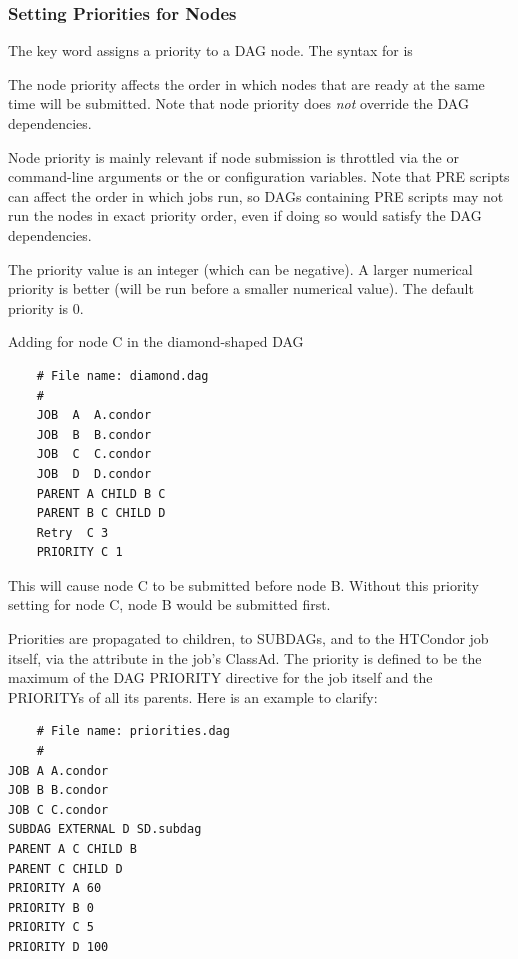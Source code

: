 \subsubsection{Setting Priorities for Nodes}

The  key word assigns a priority to a DAG node.
The syntax for  is

  

The node priority affects the order in which nodes that are ready
at the same time will be submitted.  Note that node priority does
\emph{not} override the DAG dependencies.

Node priority is mainly relevant if
node submission is throttled via the  or 
command-line arguments or the  or
 configuration variables.  Note that PRE
scripts can affect the order in which jobs run, so DAGs containing
PRE scripts may not run the nodes in exact priority order, even if
doing so would satisfy the DAG dependencies.

The priority value is an integer (which can be negative).  A larger
numerical priority is better (will be run before a smaller numerical
value).  The default priority is 0.

Adding  for node C in the diamond-shaped
DAG
\footnotesize
\begin{verbatim}
    # File name: diamond.dag
    #
    JOB  A  A.condor 
    JOB  B  B.condor 
    JOB  C  C.condor	
    JOB  D  D.condor
    PARENT A CHILD B C
    PARENT B C CHILD D
    Retry  C 3
    PRIORITY C 1
\end{verbatim}
\normalsize

This will cause node C to be submitted before node B.
Without this priority setting for node C, node B would be submitted first.

Priorities are propagated to children, to SUBDAGs, 
and to the HTCondor job itself,
via the  attribute in the job's ClassAd. 
The priority is defined to be the maximum of the DAG PRIORITY directive 
for the job itself and the PRIORITYs of all its parents. 
Here is an example to clarify:

\footnotesize
\begin{verbatim}
    # File name: priorities.dag
    #
JOB A A.condor
JOB B B.condor
JOB C C.condor
SUBDAG EXTERNAL D SD.subdag
PARENT A C CHILD B
PARENT C CHILD D
PRIORITY A 60
PRIORITY B 0
PRIORITY C 5
PRIORITY D 100
\end{verbatim}
\normalsize

